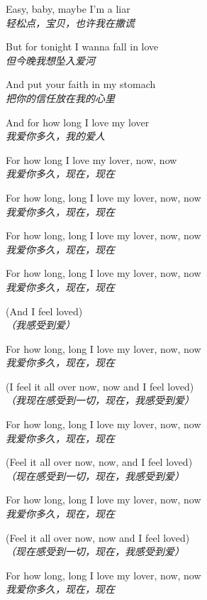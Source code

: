 \begin{spacing}{1.5}
\begin{flushleft}
Easy, baby, maybe I'm a liar\\
\textit{轻松点，宝贝，也许我在撒谎}\lyricspace

But for tonight I wanna fall in love\\
\textit{但今晚我想坠入爱河}\lyricspace

And put your faith in my stomach\\
\textit{把你的信任放在我的心里}\lyricspace

And for how long I love my lover\\
\textit{我爱你多久，我的爱人}\lyricspace

For how long I love my lover, now, now\\
\textit{我爱你多久，现在，现在}\lyricspace

For how long, long I love my lover, now, now\\
\textit{我爱你多久，现在，现在}\lyricspace

For how long, long I love my lover, now, now\\
\textit{我爱你多久，现在，现在}\lyricspace

For how long, long I love my lover, now, now\\
\textit{我爱你多久，现在，现在}\lyricspace

(And I feel loved)\\
\textit{（我感受到爱）}\lyricspace

For how long, long I love my lover, now, now\\
\textit{我爱你多久，现在，现在}\lyricspace

(I feel it all over now, now and I feel loved)\\
\textit{（我现在感受到一切，现在，我感受到爱）}\lyricspace

For how long, long I love my lover, now, now\\
\textit{我爱你多久，现在，现在}\lyricspace

(Feel it all over now, now, and I feel loved)\\
\textit{（现在感受到一切，现在，我感受到爱）}\lyricspace

For how long, long I love my lover, now, now\\
\textit{我爱你多久，现在，现在}\lyricspace

(Feel it all over now, now and I feel loved)\\
\textit{（现在感受到一切，现在，我感受到爱）}\lyricspace

For how long, long I love my lover, now, now\\
\textit{我爱你多久，现在，现在}\lyricspace


\end{flushleft}
\end{spacing}
